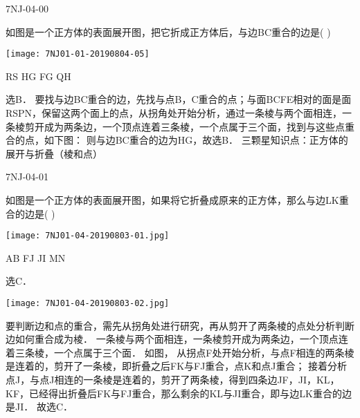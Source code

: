 
\begin{defproblem}{7NJ-04-00}%
\begin{onlyproblem}%
如图是一个正方体的表面展开图，把它折成正方体后，与边BC重合的边是(    ) 
\begin{center}
\texttt{[image: 7NJ01-01-20190804-05]}
\end{center}
\xx
{RS}
{HG}
{FG}
{QH}
\end{onlyproblem}%
\begin{onlysolution}%
\begin{solution}%
选B．
要找与边BC重合的边，先找与点B，C重合的点；与面BCFE相对的面是面RSPN，保留这两个面上的点，从拐角处开始分析，通过一条棱与两个面相连，一条棱剪开成为两条边，一个顶点连着三条棱，一个点属于三个面，找到与这些点重合的点，如下图：   则与边BC重合的边为HG，故选B． 
三颗星知识点：正方体的展开与折叠（棱和点）  
\end{solution}%
\end{onlysolution}%
\end{defproblem}



\begin{defproblem}{7NJ-04-01}%
\begin{onlyproblem}%
如图是一个正方体的表面展开图，如果将它折叠成原来的正方体，那么与边LK重合的边是(    ) 
\begin{center}
\texttt{[image: 7NJ01-04-20190803-01.jpg]}
\end{center}
\xx
{AB}
{FJ}
{JI}
{MN}
\end{onlyproblem}%
\begin{onlysolution}%
\begin{solution}%
选C．
\begin{center}
\texttt{[image: 7NJ01-04-20190803-02.jpg]}
\end{center}

要判断边和点的重合，需先从拐角处进行研究，再从剪开了两条棱的点处分析判断边如何重合成为棱． 一条棱与两个面相连，一条棱剪开成为两条边，一个顶点连着三条棱，一个点属于三个面． 如图，   从拐点F处开始分析，与点F相连的两条棱是连着的，剪开了一条棱，即折叠之后FK与FJ重合，点K和点J重合； 接着分析点J，与点J相连的一条棱是连着的，剪开了两条棱，得到四条边JF，JI，KL，KF，已经得出折叠后FK与FJ重合，那么剩余的KL与JI重合，即与边LK重合的边是JI． 故选C． 
\end{solution}%
\end{onlysolution}%
\end{defproblem}





